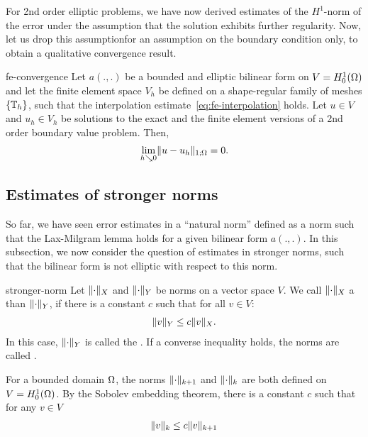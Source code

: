 \begin{intro}
  For 2nd order elliptic problems, we have now derived estimates of
  the $H^1$-norm of the error under the assumption that the solution
  exhibits further regularity. Now, let us drop this assumptionfor an
  assumption on the boundary condition only, to obtain a qualitative
  convergence result.
\end{intro}

\begin{Theorem}{fe-convergence}
  Let $a(.,.)$ be a bounded and elliptic bilinear form on
  $V = H^1_0(\Omega)$ and let the finite element space $V_h$ be
  defined on a shape-regular family of meshes $\{\mathbb T_h\}$, such that
  the interpolation estimate~\eqref{eq:fe-interpolation} holds. Let
  $u\in V$ and $u_h\in V_h$ be solutions to the exact and the finite
  element versions of a 2nd order boundary value problem. Then,
  \begin{gather}
    \lim_{h\searrow 0} \lVert u-u_h\rVert_{1;\Omega} = 0.
  \end{gather}
\end{Theorem}

\subsection{Estimates of stronger norms}

\begin{intro}
  So far, we have seen error estimates in a ``natural norm'' defined
  as a norm such that the Lax-Milgram lemma holds for a given bilinear
  form $a(.,.)$. In this subsection, we now consider the question of
  estimates in stronger norms, such that the bilinear form is not
  elliptic with respect to this norm.
\end{intro}

\begin{Definition}{stronger-norm}
  Let $\lVert\cdot\rVert_X$ and $\lVert\cdot\rVert_Y$ be norms on a vector space
  $V$. We call $\lVert\cdot\rVert_X$ a  than
  $\lVert\cdot\rVert_Y$, if there is a constant $c$ such that for all
  $v\in V$:
  \begin{gather}
    \lVert v\rVert_Y \le c \lVert v\rVert_X.
  \end{gather}
  In this case, $\lVert\cdot\rVert_Y$ is called the . If a converse inequality holds, the norms are called
  .
\end{Definition}

\begin{example}
  For a bounded domain $\Omega$, the norms $\lVert\cdot\rVert_{k+1}$ and
  $\lVert\cdot\rVert_{k}$ are both defined on $V = H^1_0(\Omega)$. By the
  Sobolev embedding theorem, there is a constant $c$ such that for any
  $v\in V$
  \begin{gather*}
    \lVert v\rVert_{k} \le c \lVert v\rVert_{k+1}
  \end{gather*}
\end{example}

